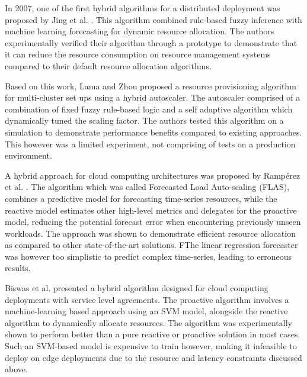In 2007, one of the first hybrid algorithms for a distributed deployment was proposed by Jing et al. \cite{xu2007use}. This algorithm combined rule-based fuzzy inference with machine learning forecasting for dynamic resource allocation. The authors experimentally verified their algorithm through a prototype to demonstrate that it can reduce the resource consumption on resource management systems compared to their default resource allocation algorithms.\par

Based on this work, Lama and Zhou \cite{lama2009efficient} proposed a resource provisioning algorithm for multi-cluster set ups using a hybrid autoscaler. The autoscaler comprised of a combination of fixed fuzzy rule-based logic and a self adaptive algorithm which dynamically tuned the scaling factor. The authors tested this algorithm on a simulation to demonstrate performance benefits compared to existing approaches. This however was a limited experiment, not comprising of tests on a production environment.\par

A hybrid approach for cloud computing architectures was proposed by Ramp{\'e}rez et al. \cite{ramperez2021flas}. The algorithm which was called Forecasted Load Auto-scaling (FLAS), combines a predictive model for forecasting time-series resources, while the reactive model estimates other high-level metrics and delegates for the proactive model, reducing the potential forecast error when encountering previously unseen workloads. The approach was shown to demonstrate efficient resource allocation as compared to other state-of-the-art solutions. FThe linear regression forecaster was however too simplistic to predict complex time-series, leading to erroneous results.\par

Biswas et al. \cite{biswas2017hybrid} presented a hybrid algorithm designed for cloud computing deployments with service level agreements. The proactive algorithm involves a machine-learning based approach using an SVM model, alongside the reactive algorithm to dynamically allocate resources. The algorithm was experimentally shown to perform better than a pure reactive or proactive solution in most cases. Such an SVM-based model is expensive to train however, making it infeasible to deploy on edge deployments due to the resource and latency constraints discussed above.\par

